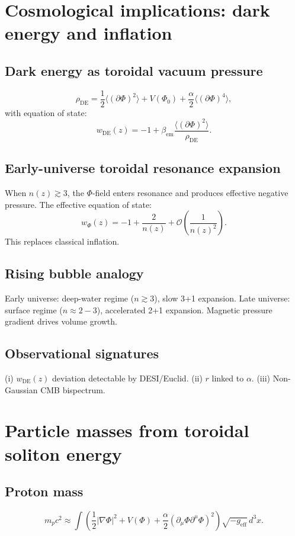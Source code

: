 \documentclass[11pt,a4paper]{article}
\begin{document}
\section{Cosmological implications: dark energy and inflation}
\label{sec:cosmo}
\subsection{Dark energy as toroidal vacuum pressure}
\label{subsec:darkenergy}
\[
\rho_{\mathrm{DE}} = \frac{1}{2}\langle (\partial \Phi)^2 \rangle + V(\Phi_0) + \frac{\alpha}{2}\langle (\partial \Phi)^4 \rangle, \tag{44}
\]
with equation of state:
\[
w_{\mathrm{DE}}(z) = -1 + \beta_{\mathrm{em}} \frac{\langle(\partial \Phi)^2\rangle}{\rho_{\mathrm{DE}}}. \tag{45}
\]

\subsection{Early-universe toroidal resonance expansion}
\label{subsec:inflation}
When \(n(z) \gtrsim 3\), the \(\Phi\)-field enters resonance and produces effective negative pressure. The effective equation of state:
\[
w_\Phi(z) = -1 + \frac{2}{n(z)} + \mathcal{O}\left( \frac{1}{n(z)^2} \right). \tag{46}
\]
This replaces classical inflation.

\subsection{Rising bubble analogy}
\label{subsec:bubble}
Early universe: deep-water regime (\(n \gtrsim 3\)), slow 3+1 expansion. Late universe: surface regime (\(n \approx 2-3\)), accelerated 2+1 expansion. Magnetic pressure gradient drives volume growth.

\subsection{Observational signatures}
\label{subsec:cosmo_signatures}
(i) \(w_{\mathrm{DE}}(z)\) deviation detectable by DESI/Euclid. (ii) \(r\) linked to \(\alpha\). (iii) Non-Gaussian CMB bispectrum.

\section{Particle masses from toroidal soliton energy}
\label{sec:masses}
\subsection{Proton mass}
\label{subsec:mp}
\[
m_p c^2 \approx \int \left( \frac{1}{2} |\nabla \Phi|^2 + V(\Phi) + \frac{\alpha}{2} (\partial_\mu \Phi \partial^\mu \Phi)^2 \right) \sqrt{-g_{\mathrm{eff}}} \, d^3x. \tag{47}
\]
\end{document}
